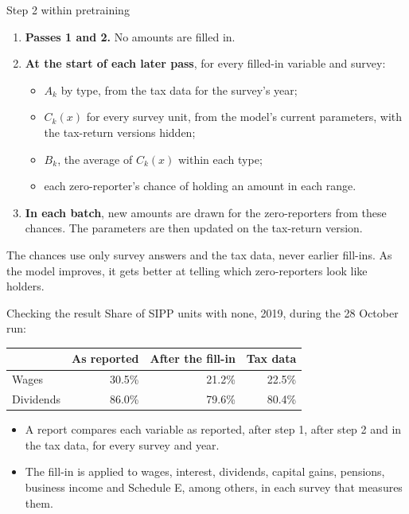\begin{frame}{Step 2 within pretraining}
  \small
  \begin{enumerate}
    \item \textbf{Passes 1 and 2.} No amounts are filled in.
    \vspace{0.3em}
    \item \textbf{At the start of each later pass}, for every filled-in variable and survey:
    \begin{itemize}
      \item $A_k$ by type, from the tax data for the survey's year;
      \item $C_k(x)$ for every survey unit, from the model's current parameters, with the
            tax-return versions hidden;
      \item $B_k$, the average of $C_k(x)$ within each type;
      \item each zero-reporter's chance of holding an amount in each range.
    \end{itemize}
    \vspace{0.3em}
    \item \textbf{In each batch}, new amounts are drawn for the zero-reporters from these chances.
          The parameters are then updated on the tax-return version.
  \end{enumerate}
  \vspace{0.4em}
  The chances use only survey answers and the tax data, never earlier fill-ins. As the model
  improves, it gets better at telling which zero-reporters look like holders.
\end{frame}

\begin{frame}{Checking the result}
  Share of SIPP units with none, 2019, during the 28 October run:
  \vspace{0.6em}
  \begin{center}
  \begin{tabular}{lrrr}
    \toprule
    & As reported & After the fill-in & Tax data \\
    \midrule
    Wages     & 30.5\% & 21.2\% & 22.5\% \\
    Dividends & 86.0\% & 79.6\% & 80.4\% \\
    \bottomrule
  \end{tabular}
  \end{center}
  \vspace{0.6em}
  \begin{itemize}
    \item A report compares each variable as reported, after step 1, after step 2 and in the tax
          data, for every survey and year.
    \item The fill-in is applied to wages, interest, dividends, capital gains, pensions, business
          income and Schedule E, among others, in each survey that measures them.
  \end{itemize}
\end{frame}


